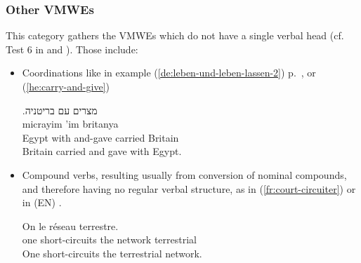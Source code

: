 \documentclass[output=paper,modfonts]{langscibook}
\begin{document}
\subsubsection{Other VMWEs}
\label{sec:oth}
%
This category gathers the VMWEs which do not have a single verbal head (cf. Test 6 in  and ). Those include:
\begin{itemize}
\item Coordinations like in example (\ref{de:leben-und-leben-lassen-2}) p.~\pageref{de:leben-und-leben-lassen-2}, or (\ref{he:carry-and-give})


\ea \label{he:carry-and-give}
\settowidth {}
\glll .\textup{מצרים} \textup{עם}   \textup{בריטניה} \\
micrayim 'im   britanya \\ 
Egypt with and-gave carried Britain\\ 
\glt Britain carried and gave with Egypt. 
\z

\item Compound verbs, resulting usually from conversion of nominal com\-po\-unds, and therefore having no regular verbal structure, as in (\ref{fr:court-circuiter}) or in 
(EN) . 


\ea \label{fr:court-circuiter}
\settowidth {}
\gll On  le réseau terrestre. \\
one short-circuits the network terrestrial \\ 
\glt One short-circuits the terrestrial network. 
\z

\end{itemize}
\end{document}
